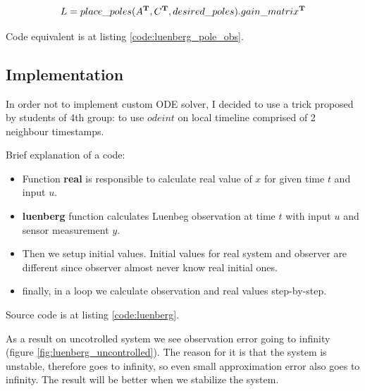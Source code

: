 \documentclass[12pt,letterpaper]{article}
\begin{document}
        \begin{equation*}
            L = place\_poles(A^\mathbf{T}, C^\mathbf{T}, desired\_poles).gain\_matrix^\mathbf{T}
        \end{equation*}
        
        Code equivalent is at listing \ref{code:luenberg_pole_obs}.
        
        
    \subsection*{Implementation}
        In order not to implement custom ODE solver, I decided to use a trick proposed by students of 4th group:
        to use $odeint$ on local timeline comprised of 2 neighbour timestamps.
        
        Brief explanation of a code:
        \begin{itemize}
            \item Function \textbf{real} is responsible to calculate real value of $x$ for given time $t$ and input $u$.
            \item \textbf{luenberg} function calculates Luenbeg observation at time $t$ with input $u$ and sensor measurement $y$.
            \item Then we setup initial values. Initial values for real system and observer are different since observer almost never know real initial ones.
            \item finally, in a loop we calculate observation and real values step-by-step.
        \end{itemize}
        
        Source code is at listing \ref{code:luenberg}.
        
        
        As a result on uncotrolled system we see observation error going to infinity (figure \ref{fig:luenberg_uncontrolled}). The reason for it is that the system is unstable, therefore goes to infinity, so even small approximation error also goes to infinity. The result will be better when we stabilize the system.
        
\end{document}
